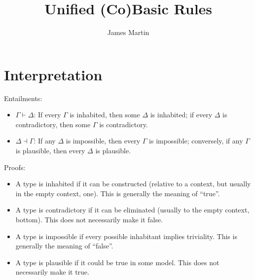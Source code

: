 \documentclass{article}
\author{James Martin}
\title{Unified (Co)Basic Rules}
\begin{document}
\maketitle
\section{Interpretation}
Entailments:
\begin{itemize}
\item $Γ ⊢ Δ$: If every $Γ$ is inhabited, then some $Δ$ is inhabited; if every $Δ$ is contradictory, then some $Γ$ is contradictory.
\item $Δ ⊣ Γ$: If any $Δ$ is impossible, then every $Γ$ is impossible; conversely, if any $Γ$ is plausible, then every $Δ$ is plausible.
\end{itemize}

Proofs:
\begin{itemize}
\item A type is inhabited if it can be constructed (relative to a context, but usually in the empty context, one). This is generally the meaning of ``true''.
\item A type is contradictory if it can be eliminated (usually to the empty context, bottom). This does not necessarily make it false.
\item A type is impossible if every possible inhabitant implies triviality. This is generally the meaning of ``false''.
\item A type is plausible if it could be true in some model. This does not necessarily make it true.
\end{itemize}

\newpage
\end{document}
